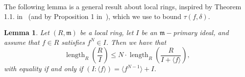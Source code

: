 \documentclass{article}
\newtheorem{lemma}[theorem]{Lemma}
\DeclareMathOperator{\length}{length}
\numberwithin{theorem}{section}
\begin{document}
The following lemma is a general result about local rings, inspired by Theorem 1.1. in~\cite{liu2018milnor} (and by Proposition 1 in~\cite{almiron2023tjurina}), which we use to bound $\tau(f, \delta)$. 

\begin{lemma}\label{lemma:Liu}
    Let $(R, \mathfrak{m})$ be a local ring, let $I$ be an $\mathfrak{m}-$primary ideal, and assume that $f \in R$ satisfies $f^N \in I$. Then we have that 
    \begin{equation*}
        \length_R\left(\frac{R}{I}\right) \leq N \cdot \length_R\left(\frac{R}{I+\langle f \rangle}\right), 
    \end{equation*}
    \noindent with equality if and only if $(I \colon \langle f\rangle) = \langle f^{N-1}\rangle + I$. 
\end{lemma}
\end{document}
